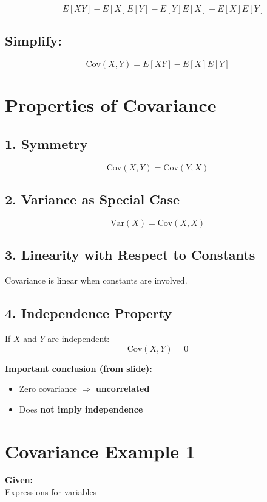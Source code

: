 \documentclass[12pt]{article}
\begin{document}
\[
= E[XY] - E[X]E[Y] - E[Y]E[X] + E[X]E[Y]
\]

\subsection*{Simplify:}

\[
\boxed{\text{Cov}(X,Y) = E[XY] - E[X]E[Y]}
\]

\section{Properties of Covariance}

\subsection*{1. Symmetry}
\[
\text{Cov}(X,Y) = \text{Cov}(Y,X)
\]

\subsection*{2. Variance as Special Case}
\[
\text{Var}(X) = \text{Cov}(X,X)
\]

\subsection*{3. Linearity with Respect to Constants}

Covariance is linear when constants are involved.

\subsection*{4. Independence Property}

If $X$ and $Y$ are independent:
\[
\text{Cov}(X,Y) = 0
\]

\textbf{Important conclusion (from slide):}
\begin{itemize}
    \item Zero covariance $\Rightarrow$ \textbf{uncorrelated}
    \item Does \textbf{not imply independence}
\end{itemize}

\section{Covariance Example 1}

\textbf{Given:} \\
Expressions for variables
\end{document}
